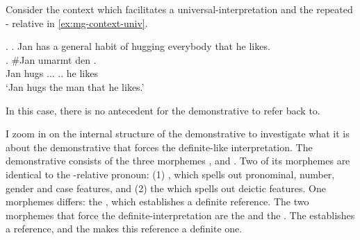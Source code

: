 Consider the context which facilitates a universal-interpretation and the repeated - relative in \ref{ex:mg-context-univ}.

\ex.
\a. Jan has a general habit of hugging everybody that he likes.\label{ex:mg-context-univ}\\
\bg. \#Jan umarmt den   .\\
Jan hugs ... .. he likes\\
`Jan hugs the man that he likes.'

In this case, there is no antecedent for the demonstrative  to refer back to.


I zoom in on the internal structure of the demonstrative  to investigate what it is about the demonstrative that forces the definite-like interpretation. The demonstrative consists of the three morphemes ,  and . Two of its morphemes are identical to the -relative pronoun: (1) , which spells out pronominal, number, gender and case features, and (2) the  which spells out deictic features. One morphemes differs: the , which establishes a definite reference. The two morphemes that force the definite-interpretation are the  and the . The  establishes a reference, and the  makes this reference a definite one.

